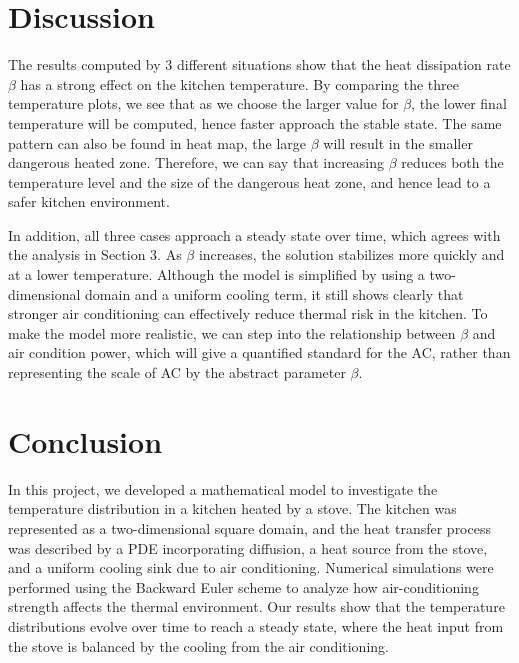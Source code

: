 \documentclass{article}
\begin{document}
\section{Discussion}\label{sec:Discussion}

The results computed by 3 different situations show that the heat dissipation rate $\beta$ has a strong effect on the kitchen temperature. By comparing the three temperature plots, we see that as we choose the larger value for $\beta$, the lower final temperature will be computed, hence faster approach the stable state. The same pattern can also be found in heat map, the large $\beta$ will result in the smaller dangerous heated zone. Therefore, we can say that increasing $\beta$ reduces both the temperature level and the size of the dangerous heat zone, and hence lead to a safer kitchen environment.

\vspace{3mm}

\noindent In addition, all three cases approach a steady state over time, which agrees with the analysis in Section 3. As $\beta$ increases, the solution stabilizes more quickly and at a lower temperature. Although the model is simplified by using a two-dimensional domain and a uniform cooling term, it still shows clearly that stronger air conditioning can effectively reduce thermal risk in the kitchen. To make the model more realistic, we can step into the relationship between $\beta$ and air condition power, which will give a quantified standard for the AC, rather than representing the scale of AC by the abstract parameter $\beta$.

\section{Conclusion}
In this project, we developed a mathematical model to investigate the temperature distribution in a kitchen heated by a stove. The kitchen was represented as a two-dimensional square domain, and the heat transfer process was described by a PDE incorporating diffusion, a heat source from the stove, and a uniform cooling sink due to air conditioning. Numerical simulations were performed using the Backward Euler scheme to analyze how air-conditioning strength affects the thermal environment. Our results show that the temperature distributions evolve over time to reach a steady state, where the heat input from the stove is balanced by the cooling from the air conditioning.

\vspace{3mm}
\end{document}
